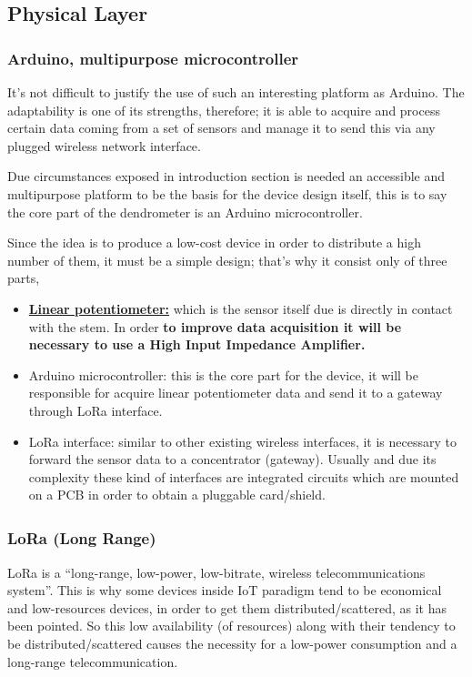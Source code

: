 \documentclass[11pt,a4paper,dvipsnames,twoside]{article}
\newcommand{\doubt}[1] {\textbf{\color{Red3}#1}}
\begin{document}
\subsection{Physical Layer}

\subsubsection{Arduino, multipurpose microcontroller}
It's not difficult to justify the use of such an interesting platform as Arduino. The adaptability is one of its strengths, therefore; it is able to acquire and process certain data coming from a set of sensors and manage it to send this via any plugged wireless network interface.

Due circumstances exposed in introduction section is needed an accessible and multipurpose platform to be the basis for the device design itself, this is to say the core part of the dendrometer is an Arduino microcontroller.  

Since the idea is to produce a low-cost device in order to distribute a high number of them, it must be a simple design; that's why it consist only of three parts,

\begin{itemize}
  \item \href{https://es.rs-online.com/web/p/products/0317780/}{\doubt{Linear potentiometer:}} which is the sensor itself due is directly in contact with the stem. In order \doubt{to improve data acquisition it will be necessary to use a High Input Impedance Amplifier.}
  \item Arduino microcontroller: this is the core part for the device, it will be responsible for acquire linear potentiometer data and send it to a gateway through LoRa interface. 
  \item LoRa interface: similar to other existing wireless interfaces, it is necessary to forward the sensor data to a concentrator (gateway). Usually and due its complexity these kind of interfaces are integrated circuits which are mounted on a PCB in order to obtain a pluggable card/shield. 
\end{itemize}

\subsubsection{\texorpdfstring{LoRa\textsuperscript{\textregistered} (Lo{\normalfont\sffamily ng} Ra{\normalfont\sffamily nge})}{LoRa (Long Range)}}
LoRa is a \enquote{long-range, low-power, low-bitrate, wireless telecommunications system}\cite[]{LoRaGeneral}. This is why some devices inside IoT paradigm tend to be economical and low-resources devices, in order to get them distributed/scattered, as it has been pointed. So this low availability (of resources) along with their tendency to be distributed/scattered causes the necessity for a low-power consumption and a long-range telecommunication.
\end{document}
